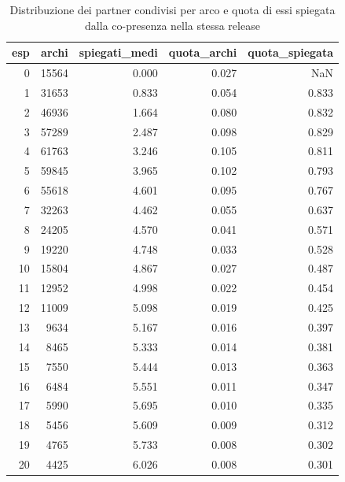 \begin{table}
\centering
\caption{Distribuzione dei partner condivisi per arco e quota di essi spiegata dalla co-presenza nella stessa release}
\label{tab:t4_proiezione_distribuzione}
\begin{tabular}{rrrrr}
\toprule
 esp &  archi &  spiegati\_medi &  quota\_archi &  quota\_spiegata \\
\midrule
   0 &  15564 &          0.000 &        0.027 &             NaN \\
   1 &  31653 &          0.833 &        0.054 &           0.833 \\
   2 &  46936 &          1.664 &        0.080 &           0.832 \\
   3 &  57289 &          2.487 &        0.098 &           0.829 \\
   4 &  61763 &          3.246 &        0.105 &           0.811 \\
   5 &  59845 &          3.965 &        0.102 &           0.793 \\
   6 &  55618 &          4.601 &        0.095 &           0.767 \\
   7 &  32263 &          4.462 &        0.055 &           0.637 \\
   8 &  24205 &          4.570 &        0.041 &           0.571 \\
   9 &  19220 &          4.748 &        0.033 &           0.528 \\
  10 &  15804 &          4.867 &        0.027 &           0.487 \\
  11 &  12952 &          4.998 &        0.022 &           0.454 \\
  12 &  11009 &          5.098 &        0.019 &           0.425 \\
  13 &   9634 &          5.167 &        0.016 &           0.397 \\
  14 &   8465 &          5.333 &        0.014 &           0.381 \\
  15 &   7550 &          5.444 &        0.013 &           0.363 \\
  16 &   6484 &          5.551 &        0.011 &           0.347 \\
  17 &   5990 &          5.695 &        0.010 &           0.335 \\
  18 &   5456 &          5.609 &        0.009 &           0.312 \\
  19 &   4765 &          5.733 &        0.008 &           0.302 \\
  20 &   4425 &          6.026 &        0.008 &           0.301 \\

\end{tabular}
\end{table}
